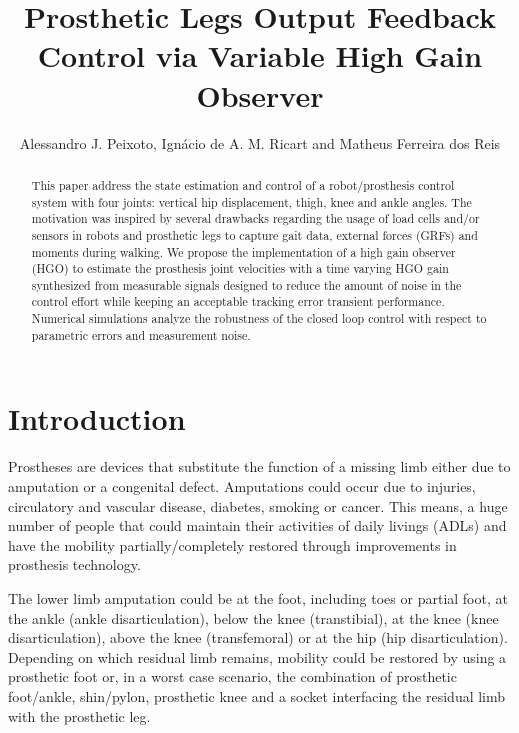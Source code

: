 \documentclass[letterpaper, 10 pt, conference]{ieeeconf}  %
\title{\LARGE \bf
Prosthetic Legs Output Feedback Control via Variable High Gain Observer}
\author{Alessandro J. Peixoto, %
        Ign\'{a}cio de A. M. Ricart and
        Matheus Ferreira dos Reis %
}
\theoremstyle{plain}
\theoremstyle{definition}
\theoremstyle{remark}
\begin{document}

\maketitle
\thispagestyle{empty}
\pagestyle{empty}
\begin{abstract}%
This paper address the state estimation and control of a robot/prosthesis control system with four joints: vertical hip displacement, thigh, knee and ankle angles. The motivation was inspired by several drawbacks regarding the usage of load cells and/or sensors in robots and prosthetic legs to capture gait data, external forces (GRFs) and moments during walking. We propose the implementation of a high gain observer (HGO)  to estimate the  prosthesis joint velocities with a time varying HGO gain synthesized from measurable signals designed to reduce the amount of noise in the control effort while keeping an acceptable tracking error transient performance. Numerical simulations analyze the robustness of the closed loop control with respect
to parametric errors and measurement noise.
\end{abstract}
\section{Introduction}

Prostheses are devices that substitute the function of a missing limb either due to amputation or a congenital defect. Amputations could occur due to injuries, circulatory and vascular disease, diabetes, smoking or cancer. This means, a huge number of people that could maintain their activities of daily livings (ADLs) and have the mobility partially/completely restored through improvements in prosthesis technology.

The lower limb amputation could be at the foot, including toes or partial foot, at the ankle (ankle disarticulation), below the knee (transtibial), at the knee (knee disarticulation), above the knee (transfemoral) or at the hip (hip disarticulation). Depending on which residual limb remains, mobility could be restored by using a prosthetic foot or, in a worst case scenario, the combination of prosthetic foot/ankle, shin/pylon, prosthetic knee and a socket interfacing the residual limb with the prosthetic leg. 
\end{document}

